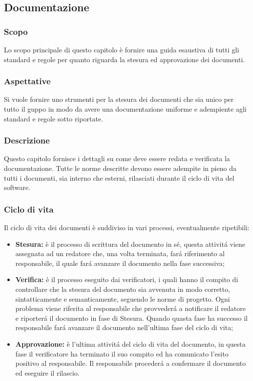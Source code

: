 \subsection{Documentazione}

		\subsubsection{Scopo}
			Lo scopo principale di questo capitolo è fornire una guida esaustiva di tutti gli standard e regole per quanto riguarda la stesura ed approvazione dei documenti.
		\subsubsection{Aspettative}
			Si vuole fornire uno strumenti per la stesura dei documenti che sia unico per tutto il guppo in modo da avere una documentazione uniforme e adempiente agli standard e regole sotto riportate.
		\subsubsection{Descrizione}
			Questo capitolo fornisce i dettagli su come deve essere redata e verificata la documentazione. Tutte le norme descritte devono essere adempite in pieno da tutti i documenti, sia interno che esterni, rilasciati durante il ciclo di vita del software.

		\subsubsection{Ciclo di vita}
			Il ciclo di vita dei documenti è suddiviso in vari processi, eventualmente ripetibili:
			\begin{itemize}
				\item \textbf{Stesura:} è il processo di scrittura del documento in sé, questa attivitá viene assegnata ad un redatore che, una volta terminata, fará riferimento al responsabile, il quale fará avanzare il documento nella fase successiva;
				\item \textbf{Verifica:} è il processo eseguito dai verificatori, i quali hanno il compito di controllare che la stesura del documento sia avvenuta in modo corretto, sintatticamente e semanticamente, seguendo le norme di progetto. Ogni problema viene riferita al responsabile che provvederá a notificare il redatore e riporterá il documento in fase di Stesura. Quando quasta fase ha successo il responsabile fará avanzare il documento nell'ultima fase del ciclo di vita;
				\item \textbf{Approvazione:} è l'ultima attivitá del ciclo di vita del documento, in questa fase il verificatore ha terminato il suo compito ed ha comunicato l'esito positivo al responsabile. Il responsabile procederá a confermare il documento ed eseguire il rilascio.
			\end{itemize}

